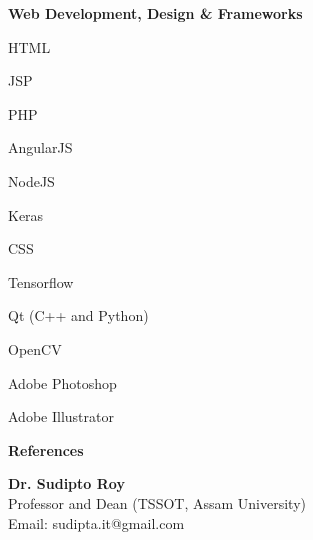 \documentclass[a4paper,11pt,final]{memoir}
\newcommand{\Sep}{\vspace{1.5em}}
\newcommand{\SmallSep}{\vspace{0.5em}}
\newcommand{\CVSection}[1]
	{\Large\textbf{#1}\par
	\SmallSep\normalsize\normalfont}
\newcommand{\CVItem}[1]
	{\textbf{\color{RoyalBlue} #1}}
\begin{document}
\CVItem{Web Development, Design \&  Frameworks}
\begin{multicols}{3}
\begin{compactitem}[\color{RoyalBlue}$\circ$]
	\item HTML
	\item JSP
	\item PHP 
	\item AngularJS
	\item NodeJS
	\item Keras
	\item CSS
	\item Tensorflow
	\item Qt (C++ and Python)
	\item OpenCV
	\item Adobe Photoshop
	\item Adobe Illustrator
	
\end{compactitem}
\end{multicols}
\Sep 
\CVSection{References}
\CVItem{Dr. Sudipto Roy}\\
Professor and Dean (TSSOT, Assam University)\\
Email: sudipta.it@gmail.com\\

\end{document}
